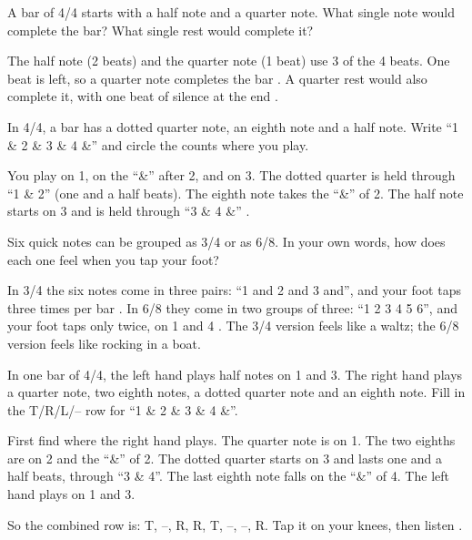 \begin{exercise}
A bar of 4/4 starts with a half note and a quarter note. What single note would complete the bar? What single rest would complete it?
\end{exercise}

\begin{answerbox}
The half note (2 beats) and the quarter note (1 beat) use 3 of the 4 beats. One beat is left, so a quarter note completes the bar . A quarter rest would also complete it, with one beat of silence at the end .
\end{answerbox}

\begin{exercise}
In 4/4, a bar has a dotted quarter note, an eighth note and a half note. Write ``1 \& 2 \& 3 \& 4 \&'' and circle the counts where you play.
\end{exercise}

\begin{answerbox}
You play on 1, on the ``\&'' after 2, and on 3. The dotted quarter is held through ``1 \& 2'' (one and a half beats). The eighth note takes the ``\&'' of 2. The half note starts on 3 and is held through ``3 \& 4 \&'' .
\end{answerbox}

\begin{exercise}
Six quick notes can be grouped as 3/4 or as 6/8. In your own words, how does each one feel when you tap your foot?
\end{exercise}

\begin{answerbox}
In 3/4 the six notes come in three pairs: ``1 and 2 and 3 and'', and your foot taps three times per bar . In 6/8 they come in two groups of three: ``1 2 3 4 5 6'', and your foot taps only twice, on 1 and 4 . The 3/4 version feels like a waltz; the 6/8 version feels like rocking in a boat.
\end{answerbox}

\begin{exercise}
In one bar of 4/4, the left hand plays half notes on 1 and 3. The right hand plays a quarter note, two eighth notes, a dotted quarter note and an eighth note. Fill in the T/R/L/-- row for ``1 \& 2 \& 3 \& 4 \&''.
\end{exercise}

\begin{answerbox}
First find where the right hand plays. The quarter note is on 1. The two eighths are on 2 and the ``\&'' of 2. The dotted quarter starts on 3 and lasts one and a half beats, through ``3 \& 4''. The last eighth note falls on the ``\&'' of 4. The left hand plays on 1 and 3.

So the combined row is: T, --, R, R, T, --, --, R. Tap it on your knees, then listen .
\end{answerbox}
